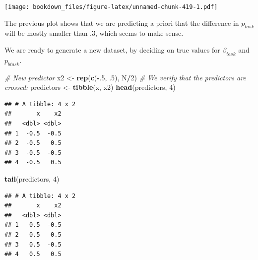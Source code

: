 \documentclass[12pt,]{krantz}
\newenvironment{Shaded}{\begin{snugshade}}{\end{snugshade}}
\newcommand{\CommentTok}[1]{\textcolor[rgb]{0.56,0.35,0.01}{\textit{#1}}}
\newcommand{\DecValTok}[1]{\textcolor[rgb]{0.00,0.00,0.81}{#1}}
\newcommand{\FloatTok}[1]{\textcolor[rgb]{0.00,0.00,0.81}{#1}}
\newcommand{\KeywordTok}[1]{\textcolor[rgb]{0.13,0.29,0.53}{\textbf{#1}}}
\newcommand{\NormalTok}[1]{#1}
\newcommand{\OperatorTok}[1]{\textcolor[rgb]{0.81,0.36,0.00}{\textbf{#1}}}
\newcommand{\StringTok}[1]{\textcolor[rgb]{0.31,0.60,0.02}{#1}}
\theoremstyle{definition}
\theoremstyle{definition}
\theoremstyle{definition}
\theoremstyle{remark}
\begin{document}
\texttt{[image: bookdown\_files/figure-latex/unnamed-chunk-419-1.pdf]}

The previous plot shows that we are predicting a priori that the difference in \(p_{task}\) will be mostly smaller than \(.3\), which seems to make sense.

We are ready to generate a new dataset, by deciding on true values for \(\beta_{task}\) and \(p_{btask}\).

\begin{Shaded}
\begin{Highlighting}[]
\CommentTok{# New predictor}
\NormalTok{x2 <-}\StringTok{ }\KeywordTok{rep}\NormalTok{(}\KeywordTok{c}\NormalTok{(}\OperatorTok{-}\NormalTok{.}\DecValTok{5}\NormalTok{, }\FloatTok{.5}\NormalTok{), N}\OperatorTok{/}\DecValTok{2}\NormalTok{)}
\CommentTok{# We verify that the predictors are crossed:}
\NormalTok{predictors <-}\StringTok{ }\KeywordTok{tibble}\NormalTok{(x, x2)}
\KeywordTok{head}\NormalTok{(predictors, }\DecValTok{4}\NormalTok{)}
\end{Highlighting}
\end{Shaded}

\begin{verbatim}
## # A tibble: 4 x 2
##       x    x2
##   <dbl> <dbl>
## 1  -0.5  -0.5
## 2  -0.5   0.5
## 3  -0.5  -0.5
## 4  -0.5   0.5
\end{verbatim}

\begin{Shaded}
\begin{Highlighting}[]
\KeywordTok{tail}\NormalTok{(predictors, }\DecValTok{4}\NormalTok{)}
\end{Highlighting}
\end{Shaded}

\begin{verbatim}
## # A tibble: 4 x 2
##       x    x2
##   <dbl> <dbl>
## 1   0.5  -0.5
## 2   0.5   0.5
## 3   0.5  -0.5
## 4   0.5   0.5
\end{verbatim}
\end{document}
